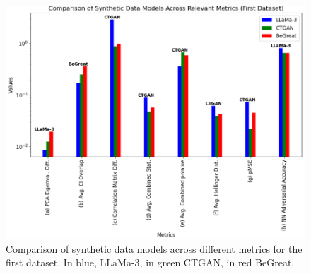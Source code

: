 \vspace{0.5cm}


\begin{figure}[H]
    \centering
        \centering
        \includegraphics[width=1\textwidth]{images/dataset1_metrics.png}
        \caption{Comparison of synthetic data models across different metrics for the first dataset. In blue, LLaMa-3, in green CTGAN, in red BeGreat.}
        \label{fig:dataset1_metrics}
\end{figure}

